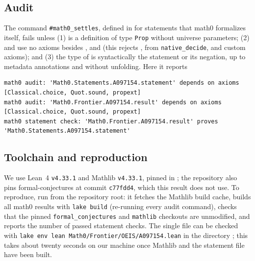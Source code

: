 \documentclass[11pt]{amsart}
\theoremstyle{plain}
\theoremstyle{definition}
\begin{document}
\subsection*{Audit}
The command \texttt{\#math0\_settles}, defined in  for statements that math0 formalizes itself, fails unless (1)  is a definition of type \texttt{Prop} without universe parameters; (2)  and  use no axioms besides ,  and  (this rejects ,  from \texttt{native\_decide}, and custom axioms); and (3) the type of  is syntactically the statement or its negation, up to metadata annotations and without unfolding. Here it reports
\begin{lstlisting}[basicstyle=\ttfamily\tiny]
math0 audit: 'Math0.Statements.A097154.statement' depends on axioms [Classical.choice, Quot.sound, propext]
math0 audit: 'Math0.Frontier.A097154.result' depends on axioms [Classical.choice, Quot.sound, propext]
math0 statement check: 'Math0.Frontier.A097154.result' proves 'Math0.Statements.A097154.statement'
\end{lstlisting}

\subsection*{Toolchain and reproduction}
We use Lean~4 \cite{Lean4} \texttt{v4.33.1} and Mathlib \cite{Mathlib} \texttt{v4.33.1}, pinned in ; the repository also pins formal-conjectures \cite{FC} at commit \texttt{c77fdd4}, which this result does not use.
To reproduce, run  from the repository root: it fetches the Mathlib build cache, builds all math0 results with \texttt{lake build} (re-running every audit command), checks that the pinned \texttt{formal\_conjectures} and \texttt{mathlib} checkouts are unmodified, and reports the number of passed statement checks. The single file can be checked with \texttt{lake env lean Math0/Frontier/OEIS/A097154.lean} in the directory ; this takes about twenty seconds on our machine once Mathlib and the statement file have been built.
\end{document}
